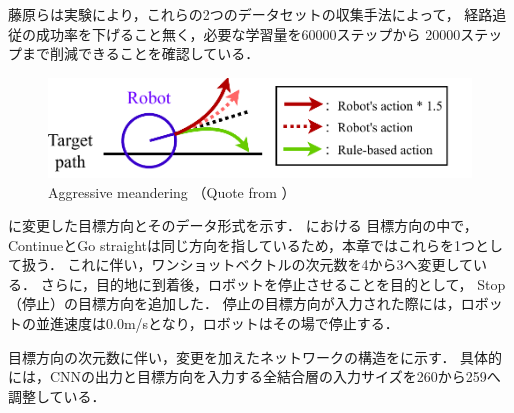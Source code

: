 藤原らは実験により，これらの2つのデータセットの収集手法によって，
経路追従の成功率を下げること無く，必要な学習量を60000ステップから
20000ステップまで削減できることを確認している．
\begin{figure}[htbp]
    \centering
     \includegraphics[width=130mm]{images/pdf/dakou.pdf}
     \caption{Aggressive meandering （Quote from \cite{fujiwara2023}）}\label{fig:dakou}
\end{figure}
\newpage

に変更した目標方向とそのデータ形式を示す．
における
目標方向の中で，ContinueとGo straightは同じ方向を指しているため，本章ではこれらを1つとして扱う．
これに伴い，ワンショットベクトルの次元数を4から3へ変更している．
さらに，目的地に到着後，ロボットを停止させることを目的として，
Stop（停止）の目標方向を追加した．
停止の目標方向が入力された際には，ロボットの並進速度は0.0m/sとなり，ロボットはその場で停止する．

目標方向の次元数に伴い，変更を加えたネットワークの構造をに示す．
具体的には，CNNの出力と目標方向を入力する全結合層の入力サイズを260から259へ調整している．

